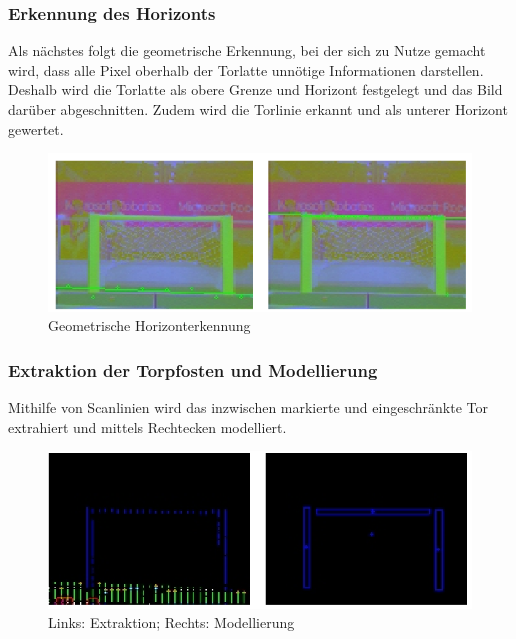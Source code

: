 \documentclass[a4paper,12pt]{article}
\begin{document}
\subsubsection{Erkennung des Horizonts}
Als nächstes folgt die geometrische Erkennung, bei der sich zu Nutze gemacht
wird, dass alle Pixel oberhalb der Torlatte unnötige Informationen
darstellen. Deshalb wird die Torlatte als obere Grenze und Horizont 
festgelegt und das Bild darüber abgeschnitten. Zudem wird die Torlinie
erkannt und als unterer Horizont gewertet.
\begin{figure}[H]
    \includegraphics[scale=0.8]{geometric-plane.png}
    \caption{Geometrische Horizonterkennung}
    \label{fig:geom-horiz}
\end{figure}

\subsubsection{Extraktion der Torpfosten und Modellierung}
Mithilfe von Scanlinien wird das inzwischen markierte und eingeschränkte Tor
extrahiert und mittels Rechtecken modelliert.
\begin{figure}[H]
    \includegraphics[scale=0.8]{goal-blobs.png}
    \caption{Links: Extraktion; Rechts: Modellierung}
    \label{fig:model}
\end{figure}
\end{document}
